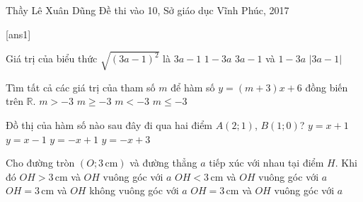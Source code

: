 \begin{name}
{Thầy  Lê Xuân Dũng}
{Đề thi vào 10, Sở giáo dục Vĩnh Phúc, 2017}
\end{name}
\setcounter{ex}{0}
[ans1]
\begin{ex}%
Giá trị của biểu thức $\sqrt{(3a-1)^2}$ là
\choice
{$3a-1$}
{$1-3a$}
{$3a-1$ và $1-3a$}
{\True $|3a-1|$}
\end{ex}

\begin{ex}%
Tìm tất cả các giá trị của tham số $m$ để hàm số $y=(m+3)x+6$ đồng biến trên $\mathbb{R}$.
\choice
{\True $ m>-3$}
{$m\ge -3$}
{$m <  -3$}
{$m \le -3$}
\end{ex}

\begin{ex}%
Đồ thị của hàm số nào sau đây đi qua hai điểm $A(2;1)$, $B(1;0)$?
\choice
{$ y = x+1$}
{\True $y=x-1$}
{$y=-x+1$}
{$y=-x+3$}
\end{ex}

\begin{ex}%
Cho đường tròn $(O;3 \, \mathrm{cm})$ và đường thẳng $a$ tiếp xúc với nhau tại điểm $H$. Khi đó
\choice
{$ OH > 3 \, \mathrm{cm}$ và $OH$ vuông góc với $a$}
{$ OH < 3 \, \mathrm{cm}$ và $OH$ vuông góc với $a$}
{$ OH = 3 \, \mathrm{cm}$ và $OH$ không vuông góc với $a$}
{\True $ OH = 3\,  \mathrm{cm}$ và $OH$ vuông góc với $a$}
\end{ex}

